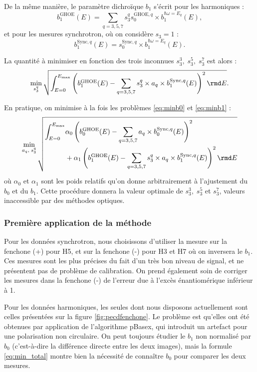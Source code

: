 De la même manière, le paramètre dichroïque $b_1$ s'écrit pour les harmoniques :
\[ b^{\text{GHOE}}_1(E) = \sum_{q={3,5,7}} s^q_3 s^{\text{GHOE},q}_0 \times b^{\hbar\omega=E_q}_1(E),\]
et pour les mesures synchrotron, où on considère $s_3=1$ :
\[ b^{\text{Sync},q}_1(E) =  s^{\text{Sync},q}_0 \times b^{\hbar\omega=E_q}_1(E).\]

La quantité à minimiser en fonction des trois inconnues $s_3^3,\;s_3^5,\;s_3^7$ est alors :
\begin{equation}
\min_{s_3^q} \sqrt{\int_{E=0}^{E_\text{max}} \left(b^{\text{GHOE}}_1(E)-\sum_{q={3,5,7}} s^q_3 \times a_q \times b^{\text{Sync},q}_1(E)\right)^2\rmd E}.
\label{eq:minb1}
\end{equation}

En pratique, on minimise à la fois les problèmes \ref{eq:minb0} et \ref{eq:minb1} :
\begin{equation}
\min_{a_q,\;s_3^q} \sqrt{
	\begin{aligned}
	\int_{E=0}^{E_\text{max}}&\alpha_0\left(b^{\text{GHOE}}_0(E)-\sum_{q={3,5,7}} a_q \times b^{\text{Sync},q}_0(E)\right)^2 \\
	&+ \alpha_1\left(b^{\text{GHOE}}_1(E)-\sum_{q={3,5,7}} s^q_3 \times a_q \times b^{\text{Sync},q}_1(E)\right)^2	\rmd E
	\end{aligned}
	}
\label{eq:min_total}
\end{equation}
où $\alpha_0$ et $\alpha_1$ sont les poids relatifs qu'on donne arbitrairement à l'ajustement du $b_0$ et du $b_1$. Cette procédure donnera la valeur optimale de $s_3^3,\;s_3^5$ et $s_3^7$, valeurs inaccessible par des méthodes optiques.

\subsubsection{Première application de la méthode}
Pour les données synchrotron, nous choisissons d'utiliser la mesure sur la fenchone (+) pour H5, et sur la fenchone (-) pour H3 et H7 où on inversera le $b_1$. Ces mesures sont les plus précises du fait d'un très bon niveau de signal, et ne présentent pas de problème de calibration. On prend également soin de corriger les mesures dans la fenchone (-) de l'erreur due à l'excès énantiomérique inférieur à 1.

Pour les données harmoniques, les seules dont nous disposons actuellement sont celles présentées sur la figure \ref{fig:pecdfenchone}. Le problème est qu'elles ont été obtenues par application de l'algorithme pBasex, qui introduit un artefact pour une polarisation non circulaire. On peut toujours étudier le $b_1$ non normalisé par $b_0$ (c'est-à-dire la différence directe entre les deux images), mais la formule \ref{eq:min_total} montre bien la nécessité de connaître $b_0$ pour comparer les deux mesures.

